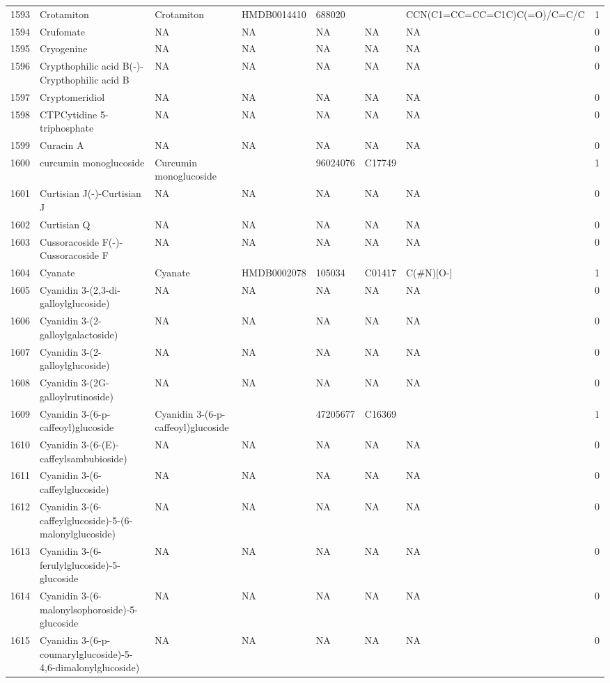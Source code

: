 \documentclass[a4paper]{article}
\begin{document}
\begin{longtable}{rlllllll}
  1593 & Crotamiton & Crotamiton & HMDB0014410 & 688020 &  & CCN(C1=CC=CC=C1C)C(=O)/C=C/C & 1 \\ 
  1594 & Crufomate & NA & NA & NA & NA & NA & 0 \\ 
  1595 & Cryogenine & NA & NA & NA & NA & NA & 0 \\ 
  1596 & Crypthophilic acid B(-)-Crypthophilic acid B & NA & NA & NA & NA & NA & 0 \\ 
  1597 & Cryptomeridiol & NA & NA & NA & NA & NA & 0 \\ 
  1598 & CTPCytidine 5-triphosphate & NA & NA & NA & NA & NA & 0 \\ 
  1599 & Curacin A & NA & NA & NA & NA & NA & 0 \\ 
  1600 & curcumin monoglucoside & Curcumin monoglucoside &  & 96024076 & C17749 &  & 1 \\ 
  1601 & Curtisian J(-)-Curtisian J & NA & NA & NA & NA & NA & 0 \\ 
  1602 & Curtisian Q & NA & NA & NA & NA & NA & 0 \\ 
  1603 & Cussoracoside F(-)-Cussoracoside F & NA & NA & NA & NA & NA & 0 \\ 
  1604 & Cyanate & Cyanate & HMDB0002078 & 105034 & C01417 & C(\#N)[O-] & 1 \\ 
  1605 & Cyanidin 3-(2,3-di-galloylglucoside) & NA & NA & NA & NA & NA & 0 \\ 
  1606 & Cyanidin 3-(2-galloylgalactoside) & NA & NA & NA & NA & NA & 0 \\ 
  1607 & Cyanidin 3-(2-galloylglucoside) & NA & NA & NA & NA & NA & 0 \\ 
  1608 & Cyanidin 3-(2G-galloylrutinoside) & NA & NA & NA & NA & NA & 0 \\ 
  1609 & Cyanidin 3-(6-p-caffeoyl)glucoside & Cyanidin 3-(6-p-caffeoyl)glucoside &  & 47205677 & C16369 &  & 1 \\ 
  1610 & Cyanidin 3-(6-(E)-caffeylsambubioside) & NA & NA & NA & NA & NA & 0 \\ 
  1611 & Cyanidin 3-(6-caffeylglucoside) & NA & NA & NA & NA & NA & 0 \\ 
  1612 & Cyanidin 3-(6-caffeylglucoside)-5-(6-malonylglucoside) & NA & NA & NA & NA & NA & 0 \\ 
  1613 & Cyanidin 3-(6-ferulylglucoside)-5-glucoside & NA & NA & NA & NA & NA & 0 \\ 
  1614 & Cyanidin 3-(6-malonylsophoroside)-5-glucoside & NA & NA & NA & NA & NA & 0 \\ 
  1615 & Cyanidin 3-(6-p-coumarylglucoside)-5-4,6-dimalonylglucoside) & NA & NA & NA & NA & NA & 0 \\ 

\end{longtable}
\end{document}

